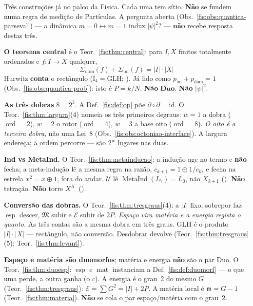 \documentclass[livro.tex]{subfiles}
\begin{document}
\begin{observacao}\label{fis:obs:quantica-glh-dobras}
Três construções já no palco da Física. Cada uma tem sítio.
\textbf{Não} se fundem numa regra de medição de Partículas.
A pergunta aberta (Obs.~\ref{fis:obs:quantica-parseval}) ---
a dinâmica \(m=0\leftrightarrow m=1\) induz
\(\lvert\psi\rvert^{2}\)? --- \textbf{não} recebe resposta
destas três.

\medskip\noindent\textbf{O teorema central} é o
Teor.~\ref{fis:thm:central}: para \(I,X\) finitos
totalmente ordenados e \(f\colon I\to X\) qualquer,
\[
\boxed{\;
\Sigma_{\mathrm{dom}}(f)+\Sigma_{\mathrm{im}}(f)
=\lvert I\rvert\cdot\lvert X\rvert
\;}
\]
Hurwitz \textbf{conta} o rectângulo
(\(\mathrm{I}_{4}=\mathrm{GLH}\);
). Já lido como
\(p_{\mathrm{im}}+p_{\mathrm{dom}}=1\)
(Obs.~\ref{fis:obs:quantica-prob}): isto é
\(P=k/N\). \textbf{Não} \(\mathbf{Duo}\).
\textbf{Não} \(\lvert\psi\rvert^{2}\).

\medskip\noindent\textbf{As três dobras} \(8=2^{3}\).
A Def.~\ref{fis:def:op} põe
\(\partial\circ\partial=\mathrm{id}\).
O Teor.~\ref{fis:thm:largura}(4) nomeia os
três primeiros degraus: \(w=1\) a dobra
(\(\operatorname{ord}=2\)), \(w=2\) o rotor
(\(\operatorname{ord}=4\)), \(w=3\) a base oito
(\(\operatorname{ord}=8\)).
\emph{O oito é a terceira dobra}, não uma
Lei~8 (Obs.~\ref{fis:obs:octoniao-interface}).
A largura endereça; a ordem percorre ---
são \(2^{w}\) lugares nas duas.

\medskip\noindent\textbf{Ind vs MetaInd.}
O Teor.~\ref{fis:thm:metainducao}: a indução
age no termo e \textbf{não} fecha; a
meta-indução lê a mesma regra na razão,
\(c_{k+1}=1\oplus 1/c_{k}\), e fecha na
estrela \(x^{2}=x\oplus 1\), fora do andar.
\(\mathcal{U}\) lê
\(\operatorname{MetaInd}(L_7)=L_0\), não
\(X_{k+1}\) ().
\textbf{Não} tetração.
\textbf{Não} torre \(X^{X^{\cdot}}\)
().

\medskip\noindent\textbf{Conversão das dobras.}
O Teor.~\ref{fis:thm:tresgraus}(4): a
\(\lvert I\rvert\) fixo, sobrepor faz
\(\operatorname{esp}\) descer,
\(\mathfrak{M}\) subir e \(\mathcal{E}\)
subir de \(2P\).
\emph{Espaço vira matéria e a energia
regista o quanto.}
As três contas são a mesma dobra em três
graus. GLH é o produto
\(\lvert I\rvert\cdot\lvert X\rvert\)
--- rectângulo, não conversão.
Desdobrar devolve
(Teor.~\ref{fis:thm:tresgraus}(5);
Teor.~\ref{fis:thm:levant}).

\medskip\noindent\textbf{Espaço e matéria
são duomorfos}; matéria e energia
\textbf{não} são o par Duo.
O Teor.~\ref{fis:thm:duoesp}:
\(\operatorname{esp}\) e \(\operatorname{mat}\)
instanciam a Def.~\ref{fis:def:duomorf} ---
o que uma perde, a outra ganha (o \(c\)).
A energia é o grau~2 do mesmo \(G\)
(Teor.~\ref{fis:thm:tresgraus}):
\(\mathcal{E}=\sum G^{2}=\lvert I\rvert+2P\).
A matéria local é \(\mathfrak{m}=G-1\)
(Teor.~\ref{fis:thm:materia}).
\textbf{Não} se cola o par
espaço/matéria com o grau~2.


\end{observacao}
\end{document}

